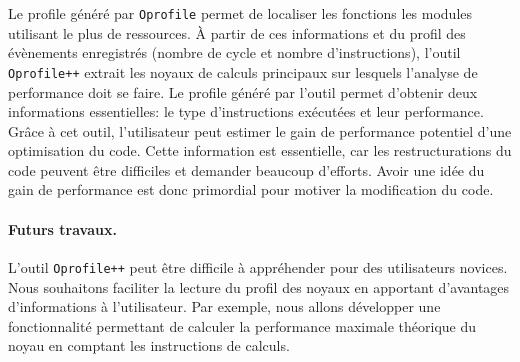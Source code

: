     Le profile généré par \verb|Oprofile| permet de localiser les fonctions les modules utilisant le plus de ressources. À partir de ces informations et du profil des évènements enregistrés (nombre de cycle et nombre d'instructions), l'outil \verb|Oprofile++| extrait les noyaux de calculs principaux sur lesquels l'analyse de performance doit se faire. Le profile généré par l'outil permet d'obtenir deux informations essentielles: le type d'instructions exécutées et leur performance. Grâce à cet outil, l'utilisateur peut estimer le gain de performance potentiel d'une optimisation du code. Cette information est essentielle, car les restructurations du code peuvent être difficiles et demander beaucoup d'efforts. Avoir une idée du gain de performance est donc primordial pour motiver la modification du code. 


    \paragraph{Futurs travaux.} L'outil \verb|Oprofile++| peut être difficile à appréhender pour des utilisateurs novices. Nous souhaitons faciliter la lecture du profil des noyaux en apportant d'avantages d'informations à l'utilisateur. Par exemple, nous allons développer une fonctionnalité permettant de calculer la performance maximale théorique du noyau en comptant les instructions de calculs.
    